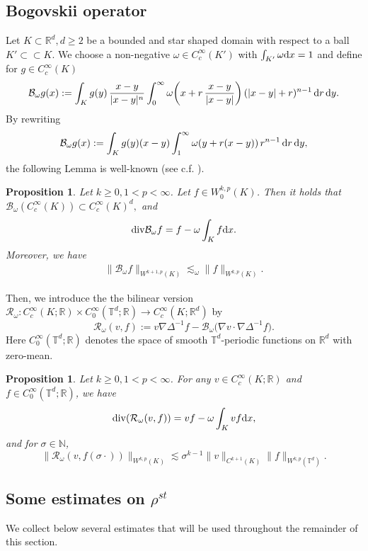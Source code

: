 \documentclass[UTF-8,reqno]{amsart}
\numberwithin{equation}{section}
\newtheorem{proposition}[theorem]{Proposition}
\theoremstyle{definition}
\def\({{\Big(}}
\def\){{\Big)}}
\def\dif{{\mathord{{\rm d}}}}
\def\mT{{\mathbb T}}
\def\geq{\geqslant}
\def\div{\mathord{{\rm div}}}
\def\({{\Big(}}
\def\){{\Big)}}
\def\dif{{\mathord{{\rm d}}}}
\def\bp{\begin{proposition}}
\def\ep{\end{proposition}}
\def\geq{\geqslant}
\def\div{\mathord{{\rm div}}}
\begin{document}
 \subsection{Bogovskii operator}\label{R:tamr}
 Let $K\subset \mathbb{R}^d,d\geq2$ be a bounded and star shaped domain with respect to a ball $K'\subset\subset K$.
We choose a non-negative $\omega \in C_c^\infty(K')$ with $\int_{K'} \omega\dif x = 1$ and define for
$g\in C_c^\infty(K)$
\begin{equation}
    \mathcal{B}_\omega g(x) := \int_{K} g(y)\,\frac{x - y}{\lvert x - y \rvert^{n}}
    \int_{0}^{\infty} \omega\!\left(x + r\,\frac{x - y}{\lvert x - y \rvert}\right)
      (|x-y|+r)^{n-1}\,\dif r\,\dif y.\notag
\end{equation}
By rewriting 
\begin{equation}
    \mathcal{B}_\omega g(x) :=\int_{K} g(y)(x - y) 
    \int_{1}^{\infty} \omega\!\left(y + r(x - y) \right)
      r^{n-1}\,\dif r\,\dif y,\notag
\end{equation}
  the following Lemma is well-known (see c.f. \cite[Theorem 1]{Bog79}).
\bp  Let $k\geq0,1 <p< \infty$. Let $f \in W_0^{k,p}(K)$. Then it holds that $ \mathcal{B}_\omega( C_c^\infty(K)) \subset C_c^\infty(K)^d,$ and 
\begin{align*}
    \div \mathcal{B}_\omega f=f-\omega\int_{K}f\dif x.
\end{align*}
Moreover, we have
\begin{align*}
    \|\mathcal{B}_\omega f\|_{W^{k+1,p}(K)}\lesssim_{\omega} \|f\|_{W^{k,p}(K)}.
\end{align*}

\ep
Then, we introduce the the bilinear version $\mathcal{R}_\omega: C^\infty_c(K; \mathbb{R}) \times C_0^\infty(\mathbb{T}^d; \mathbb{R})\to C_c^\infty(K; \mathbb{R}^{d})$  by $$\mathcal{R}_\omega(v,f):=v\nabla\Delta^{-1}f-\mathcal{B}_\omega\(\nabla v\cdot\nabla\Delta^{-1}f\).$$
Here $C^\infty_0(\mathbb{T}^d;\mathbb{R})$ denotes the space of smooth $\mathbb{T}^d$-periodic functions on $\mathbb{R}^d$ with zero-mean.

\bp \label{R:bb1_1}
Let $k\geq 0,1 < p <\infty$. For any $v \in C^\infty_c(K; \mathbb{R})$ and  $f\in C_0^\infty(\mathbb{T}^d; \mathbb{R})$, we have $$\div(\mathcal{R}_\omega(v,f))=vf-\omega\int_{K}vf\dif x,$$ and for  $\sigma\in\mathbb{N}$,
$$\|\mathcal{R}_\omega(v,f(\sigma\cdot))\|_{W^{k,p}(K)}\lesssim\sigma^{k-1}\|v\|_{C^{k+1}(K)}\|f\|_{W^{k,p}(\mT^d)}.$$
\ep 

 

\subsection{Some estimates on $\rho^{st}$}
We collect below several estimates that will be used throughout the remainder of this section.
\end{document}

